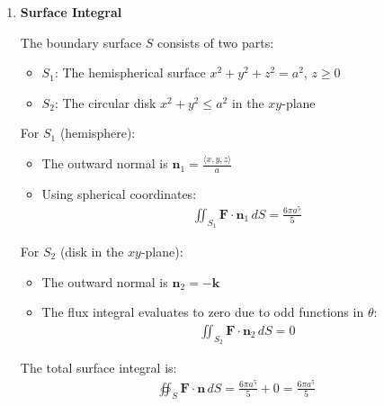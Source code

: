 \begin{example}
\begin{solution}
\begin{enumerate}
    The volume integral becomes:
    \begin{align*}
    \iiint_V \text{div }\mathbf{F}\,dV &= \int_0^{2\pi}\int_0^{\pi/2}\int_0^a (3r^2) \, r^2\sin\phi \, dr \, d\phi \, d\theta \\
    &= 3 \int_0^{2\pi}\int_0^{\pi/2}\int_0^a r^4\sin\phi \, dr \, d\phi \, d\theta \\
    &= 3 \int_0^{2\pi} d\theta \int_0^{\pi/2} \sin\phi \, d\phi \int_0^a r^4 \, dr \\
    &= 3 \cdot 2\pi \cdot 1 \cdot \frac{a^5}{5} \\
    &= \frac{6\pi a^5}{5}
    \end{align*}
    
    \item \textbf{Surface Integral}
    
    The boundary surface $S$ consists of two parts:
    \begin{itemize}
        \item $S_1$: The hemispherical surface $x^2 + y^2 + z^2 = a^2$, $z \geq 0$
        \item $S_2$: The circular disk $x^2 + y^2 \leq a^2$ in the $xy$-plane
    \end{itemize}
    
    For $S_1$ (hemisphere):
    \begin{itemize}
        \item The outward normal is $\mathbf{n}_1 = \frac{\langle x, y, z \rangle}{a}$
        \item Using spherical coordinates:
          \begin{align*}
          \iint_{S_1} \mathbf{F} \cdot \mathbf{n}_1\,dS = \frac{6\pi a^5}{5}
          \end{align*}
    \end{itemize}
    
    For $S_2$ (disk in the $xy$-plane):
    \begin{itemize}
        \item The outward normal is $\mathbf{n}_2 = -\mathbf{k}$
        \item The flux integral evaluates to zero due to odd functions in $\theta$:
          \begin{align*}
          \iint_{S_2} \mathbf{F} \cdot \mathbf{n}_2\,dS = 0
          \end{align*}
    \end{itemize}
    
    The total surface integral is:
    \begin{align*}
    \oiint_S \mathbf{F} \cdot \mathbf{n}\,dS = \frac{6\pi a^5}{5} + 0 = \frac{6\pi a^5}{5}
    \end{align*}
\end{enumerate}


\end{solution}
\end{example}
